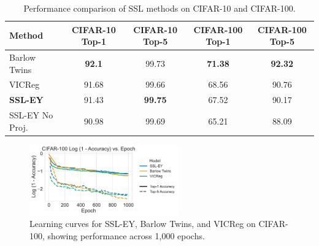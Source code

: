 \begin{table}[H]
    \centering
    \begin{tabular}{lcccc}
        \hline
        Method          & CIFAR-10 Top-1 & CIFAR-10 Top-5 & CIFAR-100 Top-1 & CIFAR-100 Top-5 \\
        \hline
        Barlow Twins    & \textbf{92.1}  & 99.73          & \textbf{71.38}  & \textbf{92.32}  \\
        VICReg          & 91.68          & 99.66          & 68.56           & 90.76           \\
        \textbf{SSL-EY} & 91.43          & \textbf{99.75} & 67.52           & 90.17           \\
        \hline
        SSL-EY No Proj. & 90.98          & 99.69          & 65.21           & 88.09           \\
        \hline
    \end{tabular}
    \caption{Performance comparison of SSL methods on CIFAR-10 and CIFAR-100.}
    \label{tab:selfsup}
\end{table}

\begin{figure}[H]
    \centering
    \includegraphics[width=0.57\textwidth]{figures/SSL/cifar100_learning_curve_log_error}
    \caption{Learning curves for SSL-EY, Barlow Twins, and VICReg on CIFAR-100, showing performance across 1,000 epochs.}
    \label{fig:ssl learning curve cifar100 top5}
\end{figure}


